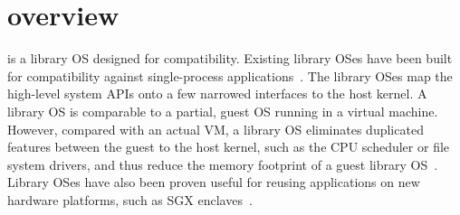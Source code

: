 \section{\graphene{} overview}
\label{sec:overview:libos}

\graphene{} is a library OS designed for compatibility.
Existing library OSes have been built for compatibility against single-process applications~\cite{porter11drawbridge}. The library OSes map the high-level system APIs onto a few narrowed interfaces to the host kernel. %
A library OS is comparable to a partial, guest OS running in a virtual machine.
However, compared with an actual VM, a library OS eliminates duplicated features between the guest to the host kernel, such as the CPU scheduler or file system drivers, and thus reduce the memory footprint of a guest library OS~\cite{porter11drawbridge,unikernels}.
Library OSes have also been proven useful for reusing applications on new hardware platforms, such as SGX enclaves~\cite{baumann14haven}.



